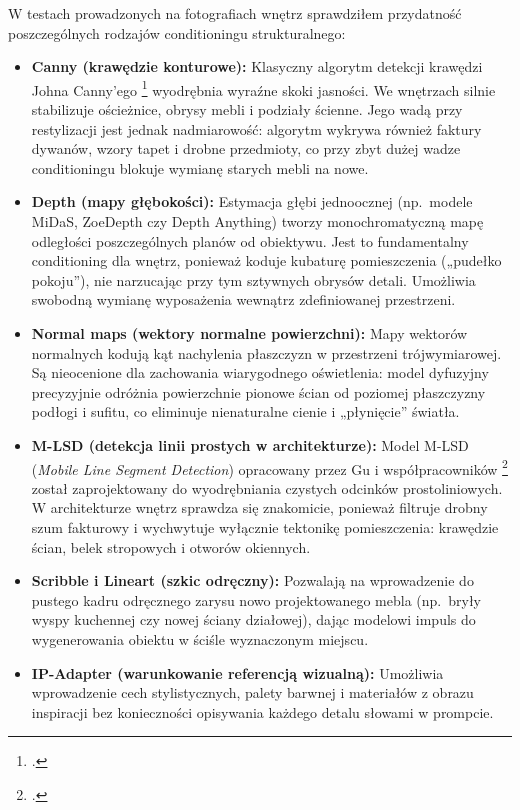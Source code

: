 W testach prowadzonych na fotografiach wnętrz sprawdziłem przydatność poszczególnych rodzajów conditioningu strukturalnego:

\begin{itemize}
  \item \textbf{Canny (krawędzie konturowe):}
    Klasyczny algorytm detekcji krawędzi Johna Canny'ego \footcite{canny1986edge} wyodrębnia wyraźne skoki jasności. We wnętrzach silnie stabilizuje ościeżnice, obrysy mebli i podziały ścienne. Jego wadą przy restylizacji jest jednak nadmiarowość: algorytm wykrywa również faktury dywanów, wzory tapet i drobne przedmioty, co przy zbyt dużej wadze conditioningu blokuje wymianę starych mebli na nowe.
  \item \textbf{Depth (mapy głębokości):}
    Estymacja głębi jednoocznej (np.\ modele MiDaS, ZoeDepth czy Depth Anything) tworzy monochromatyczną mapę odległości poszczególnych planów od obiektywu. Jest to fundamentalny conditioning dla wnętrz, ponieważ koduje kubaturę pomieszczenia („pudełko pokoju”), nie narzucając przy tym sztywnych obrysów detali. Umożliwia swobodną wymianę wyposażenia wewnątrz zdefiniowanej przestrzeni.
  \item \textbf{Normal maps (wektory normalne powierzchni):}
    Mapy wektorów normalnych kodują kąt nachylenia płaszczyzn w przestrzeni trójwymiarowej. Są nieocenione dla zachowania wiarygodnego oświetlenia: model dyfuzyjny precyzyjnie odróżnia powierzchnie pionowe ścian od poziomej płaszczyzny podłogi i sufitu, co eliminuje nienaturalne cienie i „płynięcie” światła.
  \item \textbf{M-LSD (detekcja linii prostych w architekturze):}
    Model M-LSD (\emph{Mobile Line Segment Detection}) opracowany przez Gu i współpracowników \footcite{gu2022mlsd} został zaprojektowany do wyodrębniania czystych odcinków prostoliniowych. W architekturze wnętrz sprawdza się znakomicie, ponieważ filtruje drobny szum fakturowy i wychwytuje wyłącznie tektonikę pomieszczenia: krawędzie ścian, belek stropowych i otworów okiennych.
  \item \textbf{Scribble i Lineart (szkic odręczny):}
    Pozwalają na wprowadzenie do pustego kadru odręcznego zarysu nowo projektowanego mebla (np.\ bryły wyspy kuchennej czy nowej ściany działowej), dając modelowi impuls do wygenerowania obiektu w ściśle wyznaczonym miejscu.
  \item \textbf{IP-Adapter (warunkowanie referencją wizualną):}
    Umożliwia wprowadzenie cech stylistycznych, palety barwnej i materiałów z obrazu inspiracji bez konieczności opisywania każdego detalu słowami w prompcie.
\end{itemize}

